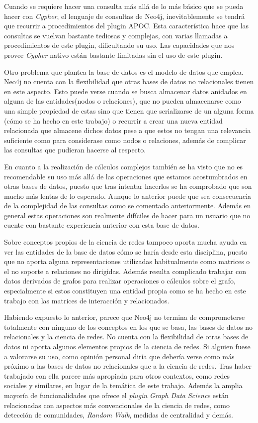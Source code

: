 Cuando se requiere hacer una consulta más allá de lo más básico que se pueda hacer con \textit{Cypher}, el lenguaje de consultas de Neo4j, inevitablemente se tendrá que recurrir a procedimientos del plugin APOC. Esta característica hace que las consultas se vuelvan bastante tediosas y complejas, con varias llamadas a procedimientos de este plugin, dificultando su uso. Las capacidades que nos provee \textit{Cypher} nativo están bastante limitadas sin el uso de este plugin.

Otro problema que plantea la base de datos es el modelo de datos que emplea. Neo4j no cuenta con la flexibilidad que otras bases de datos no relacionales tienen en este aspecto. Esto puede verse cuando se busca almacenar datos anidados en alguna de las entidades(nodos o relaciones), que no pueden almacenarse como una simple propiedad de estas sino que tienen que serializarse de un alguna forma (cómo se ha hecho en este trabajo) o recurrir a crear una nueva entidad relacionada que almacene dichos datos pese a que estos no tengan una relevancia suficiente como para considerase como nodos o relaciones, además de complicar las consultas que pudieran hacerse al respecto.

En cuanto a la realización de cálculos complejos también se ha visto que no es recomendable su uso más allá de las operaciones que estamos acostumbrados en otras bases de datos, puesto que tras intentar hacerlos se ha comprobado que son mucho más lentas de lo esperado. Aunque lo anterior puede que sea consecuencia de la complejidad de las consultas como se comentado anteriormente. Además en general estas operaciones son realmente difíciles de hacer para un usuario que no cuente con bastante experiencia anterior con esta base de datos.

Sobre conceptos propios de la ciencia de redes tampoco aporta mucha ayuda en ver las entidades de la base de datos cómo se haría desde esta disciplina, puesto que no aporta alguna representaciones utilizadas habitualmente como matrices o el no soporte a relaciones no dirigidas. Además resulta complicado trabajar con datos derivados de grafos para realizar operaciones o cálculos sobre el grafo, especialmente si estos constituyen una entidad propia como se ha hecho en este trabajo con las matrices de interacción y relacionados.

Habiendo expuesto lo anterior, parece que Neo4j no termina de comprometerse totalmente con ninguno de los conceptos en los que se basa, las bases de datos no relacionales y la ciencia de redes. No cuenta con la flexibilidad de otras bases de datos ni aporta algunos elementos propios de la ciencia de redes. Si alguien fuese a valorarse su uso, como opinión personal diría que debería verse como más próximo a las bases de datos no relacionales que a la ciencia de redes. Tras haber trabajado con ella parece más apropiada para otros contextos, como redes sociales y similares, en lugar de la temática de este trabajo. Además la amplia mayoría de funcionalidades que ofrece el \textit{plugin} \textit{Graph Data Science} están relacionadas con aspectos más convencionales de la ciencia de redes, como detección de comunidades, \textit{Random Walk}, medidas de centralidad y demás.

